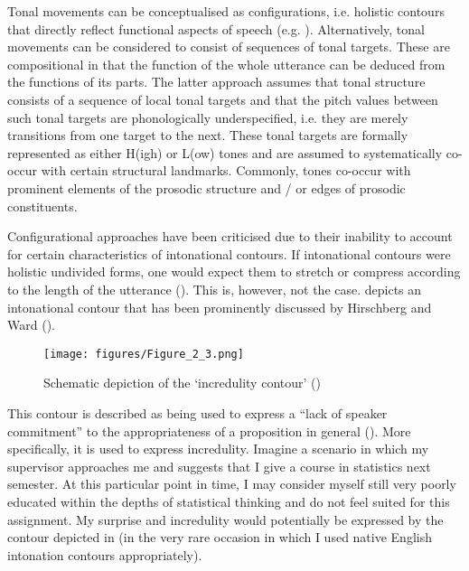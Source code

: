 Tonal movements can be conceptualised as configurations, i.e. holistic contours that directly reflect functional aspects of speech (e.g. \citealt{Bolinger1951,Crystal1969,Halliday1967,OConnorArnold1973,Kohler1991,HirstDiCristo1998,Xu2005}). Alternatively, tonal movements can be considered to consist of sequences of tonal targets. These are compositional in that the function of the whole utterance can be deduced from the functions of its parts. The latter approach assumes that tonal structure consists of a sequence of local tonal targets and that the pitch values between such tonal targets are phonologically underspecified, i.e. they are merely transitions from one target to the next. These tonal targets are formally represented as either H(igh) or L(ow) tones and are assumed to systematically co-occur with certain structural landmarks. Commonly, tones co-occur with prominent elements of the prosodic structure and / or edges of prosodic constituents.

Configurational approaches have been criticised due to their inability to account for certain characteristics of intonational contours. If intonational contours were holistic undivided forms, one would expect them to stretch or compress according to the length of the utterance (\citealt{Arvaniti2011}). This is, however, not the case.  depicts an intonational contour that has been prominently discussed by Hirschberg and Ward (\citealt{WardHirsch1985,HirschbergWard1992}). 

\begin{figure}
  \centering 
   \texttt{[image: figures/Figure\_2\_3.png]}
  \caption{Schematic depiction of the ‘incredulity contour’ (\citealt{HirschbergWard1992,Ladd2008,Arvaniti2011})}
   \label{fig:2.3}
   \end{figure}
   
This contour is described as being used to express a “lack of speaker commitment” to the appropriateness of a proposition in general (\citealt[243]{HirschbergWard1992}). More specifically, it is used to express incredulity. Imagine a scenario in which my supervisor approaches me and suggests that I give a course in statistics next semester. At this particular point in time, I may consider myself still very poorly educated within the depths of statistical thinking and do not feel suited for this assignment. My surprise and incredulity would potentially be expressed by the contour depicted in  (in the very rare occasion in which I used native English intonation contours appropriately).

